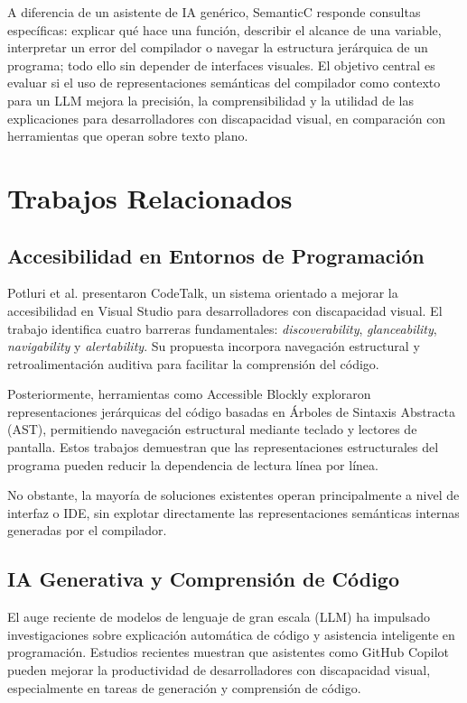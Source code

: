 \documentclass[conference]{IEEEtran}
\begin{document}
A diferencia de un asistente de IA genérico, SemanticC responde consultas específicas: explicar qué hace una función, describir el alcance de una variable, interpretar un error del compilador o navegar la estructura jerárquica de un programa; todo ello sin depender de interfaces visuales. El objetivo central es evaluar si el uso de representaciones semánticas del compilador como contexto para un LLM mejora la precisión, la comprensibilidad y la utilidad de las explicaciones para desarrolladores con discapacidad visual, en comparación con herramientas que operan sobre texto plano.
\section{Trabajos Relacionados}

\subsection{Accesibilidad en Entornos de Programación}

Potluri et al. \cite{codetalk} presentaron CodeTalk, un sistema orientado a mejorar la accesibilidad en Visual Studio para desarrolladores con discapacidad visual. El trabajo identifica cuatro barreras fundamentales: \textit{discoverability}, \textit{glanceability}, \textit{navigability} y \textit{alertability}. Su propuesta incorpora navegación estructural y retroalimentación auditiva para facilitar la comprensión del código.

Posteriormente, herramientas como Accessible Blockly \cite{accessible_blockly} exploraron representaciones jerárquicas del código basadas en Árboles de Sintaxis Abstracta (AST), permitiendo navegación estructural mediante teclado y lectores de pantalla. Estos trabajos demuestran que las representaciones estructurales del programa pueden reducir la dependencia de lectura línea por línea.

No obstante, la mayoría de soluciones existentes operan principalmente a nivel de interfaz o IDE, sin explotar directamente las representaciones semánticas internas generadas por el compilador.

\subsection{IA Generativa y Comprensión de Código}

El auge reciente de modelos de lenguaje de gran escala (LLM) ha impulsado investigaciones sobre explicación automática de código y asistencia inteligente en programación. Estudios recientes \cite{genai_accessibility} muestran que asistentes como GitHub Copilot pueden mejorar la productividad de desarrolladores con discapacidad visual, especialmente en tareas de generación y comprensión de código.
\end{document}
